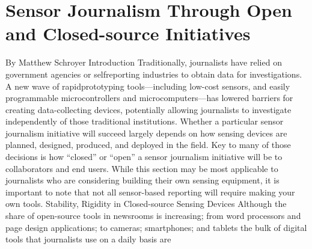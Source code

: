\section{Sensor Journalism Through Open and Closed-source Initiatives}
By Matthew Schroyer
Introduction
Traditionally, journalists have relied on government agencies or selfreporting
industries to obtain data for investigations. A new wave of rapidprototyping
tools—including low-cost sensors, and easily programmable
microcontrollers and microcomputers—has lowered barriers for creating
data-collecting devices, potentially allowing journalists to investigate independently
of those traditional institutions. Whether a particular sensor
journalism initiative will succeed largely depends on how sensing devices
are planned, designed, produced, and deployed in the field. Key to many of
those decisions is how ``closed'' or ``open'' a sensor journalism initiative will
be to collaborators and end users. While this section may be most applicable
to journalists who are considering building their own sensing equipment,
it is important to note that not all sensor-based reporting will require
making your own tools.
Stability, Rigidity in Closed-source Sensing Devices
Although the share of open-source tools in newsrooms is increasing; from
word processors and page design applications; to cameras; smartphones;
and tablets the bulk of digital tools that journalists use on a daily basis are

